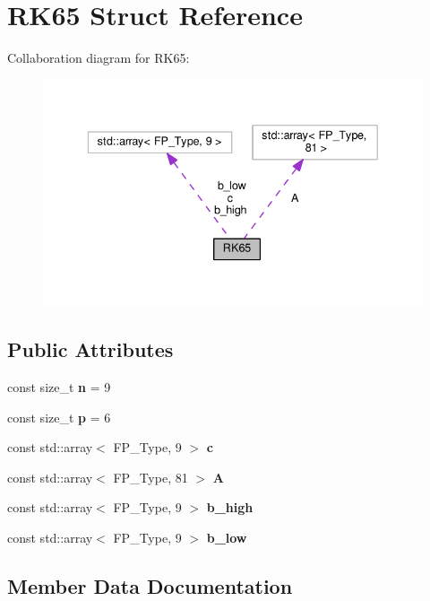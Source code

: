 \hypertarget{structRK65}{}\section{R\+K65 Struct Reference}
\label{structRK65}


Collaboration diagram for R\+K65\+:
\nopagebreak
\begin{figure}[H]
\begin{center}
\leavevmode
\includegraphics[width=336pt]{structRK65__coll__graph}
\end{center}
\end{figure}
\subsection*{Public Attributes}
\begin{DoxyCompactItemize}
\item 
\mbox{\label{structRK65_ad00bda06b6a7c74d83b34c2af2249df9}} 
const size\+\_\+t {\bfseries n} = 9
\item 
\mbox{\label{structRK65_aa74cc748421b30c372777ae98ead9404}} 
const size\+\_\+t {\bfseries p} = 6
\item 
const std\+::array$<$ F\+P\+\_\+\+Type, 9 $>$ {\bfseries c}
\item 
const std\+::array$<$ F\+P\+\_\+\+Type, 81 $>$ {\bfseries A}
\item 
const std\+::array$<$ F\+P\+\_\+\+Type, 9 $>$ {\bfseries b\+\_\+high}
\item 
const std\+::array$<$ F\+P\+\_\+\+Type, 9 $>$ {\bfseries b\+\_\+low}
\end{DoxyCompactItemize}


\subsection{Member Data Documentation}
\mbox{\label{structRK65_a54dd53be90cfb257d7739443220c833f}} 
